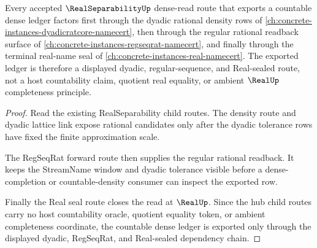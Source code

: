 \begin{theorem}
\label{thm:real-separability-dyadic-lattice-forward-route}
Every accepted $\RealSeparabilityUp$ dense-read route that exports a countable dense ledger factors first through the dyadic rational density rows of \autoref{ch:concrete-instances-dyadicratcore-namecert}, then through the regular rational readback surface of \autoref{ch:concrete-instances-regseqrat-namecert}, and finally through the terminal real-name seal of \autoref{ch:concrete-instances-real-namecert}. The exported ledger is therefore a displayed dyadic, regular-sequence, and Real-sealed route, not a host countability claim, quotient real equality, or ambient $\RealUp$ completeness principle.
\end{theorem}
\begin{proof}
Read the existing RealSeparability child routes. The density route and dyadic lattice link expose rational candidates only after the dyadic tolerance rows have fixed the finite approximation scale.

The RegSeqRat forward route then supplies the regular rational readback. It keeps the StreamName window and dyadic tolerance visible before a dense-completion or countable-density consumer can inspect the exported row.

Finally the Real seal route closes the read at $\RealUp$. Since the hub child routes carry no host countability oracle, quotient equality token, or ambient completeness coordinate, the countable dense ledger is exported only through the displayed dyadic, RegSeqRat, and Real-sealed dependency chain.
\end{proof}
